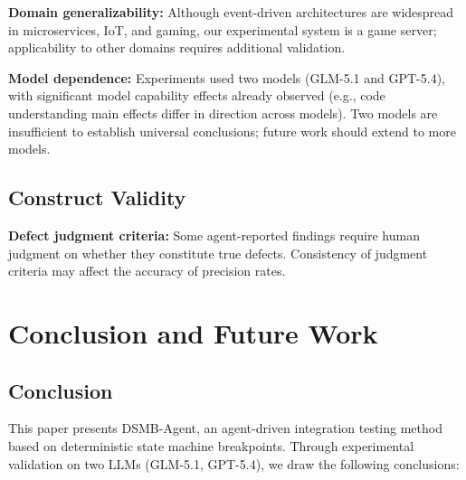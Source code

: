 \documentclass[sigconf,nonacm]{acmart}
\begin{document}
\textbf{Domain generalizability:} Although event-driven architectures are widespread in microservices, IoT, and gaming, our experimental system is a game server; applicability to other domains requires additional validation.

\textbf{Model dependence:} Experiments used two models (GLM-5.1 and GPT-5.4), with significant model capability effects already observed (e.g., code understanding main effects differ in direction across models). Two models are insufficient to establish universal conclusions; future work should extend to more models.

\subsection{Construct Validity}

\textbf{Defect judgment criteria:} Some agent-reported findings require human judgment on whether they constitute true defects. Consistency of judgment criteria may affect the accuracy of precision rates.

\section{Conclusion and Future Work}

\subsection{Conclusion}

This paper presents DSMB-Agent, an agent-driven integration testing method based on deterministic state machine breakpoints. Through experimental validation on two LLMs (GLM-5.1, GPT-5.4), we draw the following conclusions:
\end{document}
